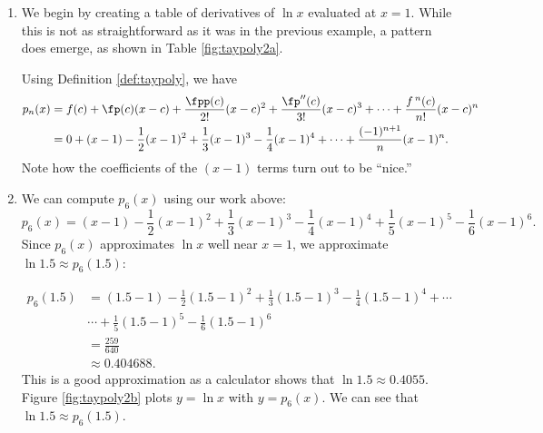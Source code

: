 \begin{solution}
{\begin{enumerate}
\item		We begin by creating a table of derivatives of $\ln x$ evaluated at $x=1$. While this is not as straightforward as it was in the previous example, a pattern does emerge, as shown in Table \ref{fig:taypoly2a}.

Using Definition \ref{def:taypoly}, we have \small
\begin{align*}
	p_n(x) &=	f(c) + \fp(c)(x-c) + \frac{\fpp(c)}{2!}(x-c)^2+\frac{\fp''(c)}{3!}(x-c)^3+\cdots+\frac{f\,^n(c)}{n!}(x-c)^n\\
					&= 0+(x-1)-\frac12(x-1)^2+\frac13(x-1)^3-\frac14(x-1)^4+\cdots+\frac{(-1)^{n+1}}{n}(x-1)^n.
\end{align*}
\normalsize
Note how the coefficients of the $(x-1)$ terms turn out to be ``nice.''

\item		We can compute $p_6(x)$ using our work above:
$$p_6(x) = (x-1)-\frac12(x-1)^2+\frac13(x-1)^3-\frac14(x-1)^4+\frac15(x-1)^5-\frac16(x-1)^6.$$
Since $p_6(x)$ approximates $\ln x$ well near $x=1$, we approximate $\ln 1.5 \approx p_6(1.5)$:

\begin{align*}
p_6(1.5) &= (1.5-1)-\frac12(1.5-1)^2+\frac13(1.5-1)^3-\frac14(1.5-1)^4+\cdots \\
			&\cdots +\frac15(1.5-1)^5-\frac16(1.5-1)^6\\
	&=\frac{259}{640}\\
	&\approx 0.404688.
\end{align*}
\normalsize
This is a good approximation as a calculator shows that $\ln 1.5 \approx 0.4055.$ Figure \ref{fig:taypoly2b} plots $y=\ln x$ with $y=p_6(x)$. We can see that $\ln 1.5\approx p_6(1.5)$.


\end{enumerate}}
\end{solution}
